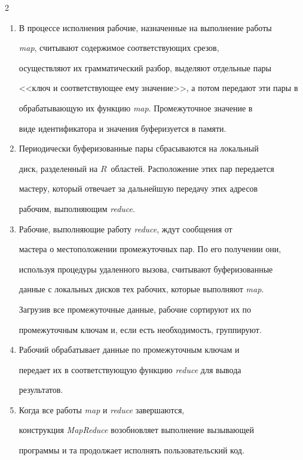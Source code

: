 \begin{multicols}{2}
\begin{enumerate}[1.]
\textit{map} и $R$~работ \textit{reduce}. Поиском свободных узлов и 


назначением работ занимается мастер. 


\item В процессе исполнения рабочие, назначенные на выполнение работы 


\textit{map}, считывают содержимое соответствующих срезов, 


осуществляют их грамматический разбор, выделяют отдельные пары 


<<ключ и соответствующее ему значение>>, а потом передают эти пары в 


обрабатывающую их функцию \textit{map}. Промежуточное значение в 


виде идентификатора и значения буферизуется в памяти. 


\item Периодически буферизованные пары сбрасываются на локальный 


диск, разделенный на $R$~областей. Расположение этих пар передается 


мастеру, который отвечает за дальнейшую передачу этих адресов 


рабочим, выполняющим \textit{reduce}. 


\item Рабочие, выполняющие работу \textit{reduce}, ждут сообщения от 


мастера о местоположении промежуточных пар. По его получении они, 


используя процедуры удаленного вызова, считывают буферизованные 


данные с локальных дисков тех рабочих, которые выполняют \textit{map}. 


Загрузив все промежуточные данные, рабочие сортируют их по 


промежуточным ключам и, если есть необходимость, группируют. 


\item Рабочий обрабатывает данные по промежуточным ключам и 


передает их в соответствующую функцию \textit{reduce} для вывода 


результатов. 


\item Когда все работы \textit{map} и \textit{reduce} завершаются, 


конструкция \textit{MapReduce} возобновляет выполнение вызывающей 


программы и та продолжает исполнять пользовательский код. 



\end{enumerate}
\end{multicols}
